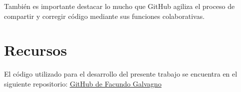 \documentclass{article}
\begin{document}
También es importante destacar lo mucho que GitHub agiliza el proceso de compartir y corregir código mediante sus funciones
colaborativas.

\section{Recursos}
\label{section:5}
El código utilizado para el desarrollo del presente trabajo se encuentra en el siguiente repositorio:
\underline{\hyperlink{https://github.com/FGalvagno/sistemas-de-control}{GitHub de Facundo Galvagno}}
\end{document}
